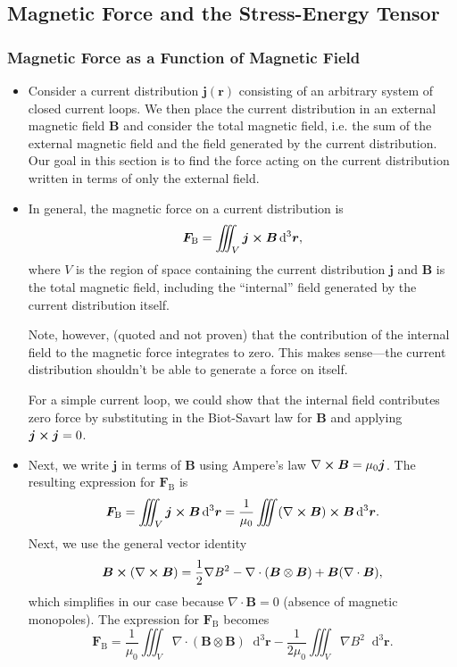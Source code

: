\documentclass[11pt, a4paper]{article}
\newcommand{\diff}{\mathop{}\!\mathrm{d}} %
\newcommand{\dr}{\diff^{3} \r}  %
\renewcommand{\vec}[1]{\bm{#1}} %
\renewcommand{\r}{\vec{r}}
\newcommand{\B}{\vec{B}} %
\newcommand{\mm}{\mu_{0}}  %
\renewcommand{\j}{\vec{j}}  %
\renewcommand{\div}{\nabla \cdot}
\renewcommand{\curl}{\nabla \cross}
\renewcommand{\grad}{\nabla}
\begin{document}
\subsection{Magnetic Force and the Stress-Energy Tensor}

\subsubsection{Magnetic Force as a Function of Magnetic Field}

\begin{itemize}
	\item Consider a current distribution $ \j(\r) $ consisting of an arbitrary system of closed current loops. We then place the current distribution in an external magnetic field $ \B $ and consider the total magnetic field, i.e. the sum of the external magnetic field and the field generated by the current distribution. Our goal in this section is to find the force acting on the current distribution written in terms of only the external field. 
	
	\item In general, the magnetic force on a current distribution is
	\begin{equation*}
		\vec{F}_{\text{B}} = \iiint_{V}\j \cross \B \dr,
	\end{equation*}
	where $ V $ is the region of space containing the current distribution $ \j $ and $ \B $ is the total magnetic field, including the ``internal'' field generated by the current distribution itself. 

    Note, however, (quoted and not proven) that the contribution of the internal field to the magnetic force integrates to zero. This makes sense---the current distribution shouldn't be able to generate a force on itself. 

    For a simple current loop, we could show that the internal field contributes zero force by substituting in the Biot-Savart law for $ \B $ and applying $ \j \cross \j = 0 $. 
	
    \item Next, we write $ \j $ in terms of $ \B $ using Ampere's law $ \curl \B = \mm \j $. The resulting expression for $ \vec{F}_{\text{B}} $ is
	\begin{equation*}
		\vec{F}_{\text{B}} = \iiint_{V}\j \cross \B \dr = \frac{1}{\mm}\iiint (\curl \B) \cross \B \dr.
	\end{equation*}
	Next, we use the general vector identity
	\begin{equation*}
		\B \cross (\curl \B) = \frac{1}{2}\grad B^{2} - \div (\B \otimes \B) + \B(\div \B),
	\end{equation*}
	which simplifies in our case because $ \div \B = 0 $ (absence of magnetic monopoles). The expression for $ \vec{F}_{\text{B}} $ becomes
	\begin{equation*}
		\vec{F}_{\text{B}} = \frac{1}{\mm}\iiint_{V} \div (\B \otimes \B)\dr - \frac{1}{2\mm}\iiint_{V} \grad B^{2}\dr.
	\end{equation*}
	

\end{itemize}
\end{document}
